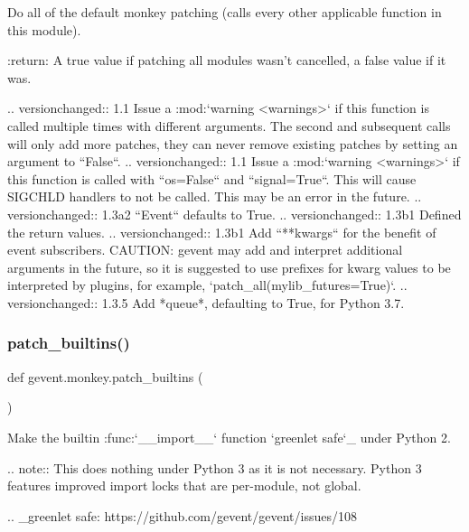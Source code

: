 \begin{DoxyVerb}Do all of the default monkey patching (calls every other applicable
function in this module).

:return: A true value if patching all modules wasn't cancelled, a false
  value if it was.

.. versionchanged:: 1.1
   Issue a :mod:`warning <warnings>` if this function is called multiple times
   with different arguments. The second and subsequent calls will only add more
   patches, they can never remove existing patches by setting an argument to ``False``.
.. versionchanged:: 1.1
   Issue a :mod:`warning <warnings>` if this function is called with ``os=False``
   and ``signal=True``. This will cause SIGCHLD handlers to not be called. This may
   be an error in the future.
.. versionchanged:: 1.3a2
   ``Event`` defaults to True.
.. versionchanged:: 1.3b1
   Defined the return values.
.. versionchanged:: 1.3b1
   Add ``**kwargs`` for the benefit of event subscribers. CAUTION: gevent may add
   and interpret additional arguments in the future, so it is suggested to use prefixes
   for kwarg values to be interpreted by plugins, for example, `patch_all(mylib_futures=True)`.
.. versionchanged:: 1.3.5
   Add *queue*, defaulting to True, for Python 3.7.
\end{DoxyVerb}
 \mbox{\label{namespacegevent_1_1monkey_a78f107b224c0bb218b319d7dc4a67187}} 
\subsubsection{\texorpdfstring{patch\+\_\+builtins()}{patch\_builtins()}}
{\footnotesize\ttfamily def gevent.\+monkey.\+patch\+\_\+builtins (\begin{DoxyParamCaption}{ }\end{DoxyParamCaption})}

\begin{DoxyVerb}Make the builtin :func:`__import__` function `greenlet safe`_ under Python 2.

.. note::
   This does nothing under Python 3 as it is not necessary. Python 3 features
   improved import locks that are per-module, not global.

.. _greenlet safe: https://github.com/gevent/gevent/issues/108\end{DoxyVerb}
 \mbox{\label{namespacegevent_1_1monkey_a7de4a05d2bb76f083f3389ee774e5d09}} 
